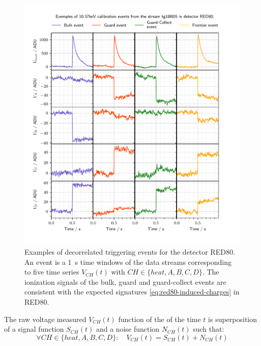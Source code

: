 \begin{figure}
\centering
\includegraphics[scale=1]{Figures/ElectrodesExperimental/pulse_raw.pdf}
\caption{Examples of decorrelated triggering events for the detector RED80. An event is a \SI{1}{\s} time windows of the data streams corresponding to five time series $V_{CH}(t)$ with $CH \in \{heat, A,B,C,D\}$. The ionization signals of the bulk, guard and guard-collect events are consistent with the expected signatures \ref{eq:red80-induced-charges} in RED80.}
\label{fig:pulse-raw}
\end{figure}

The raw voltage measured $V_{CH}(t)$ function of the of the time $t$ is superposition of a signal function $S_{CH}(t)$ and a noise function $N_{CH}(t)$ such that:
\begin{equation}
\label{eq:raw-signal-noise}
\forall CH \in \{ heat, A, B, C, D \}: \quad V_{CH}(t) = S_{CH}(t) + N_{CH}(t)
\end{equation}

